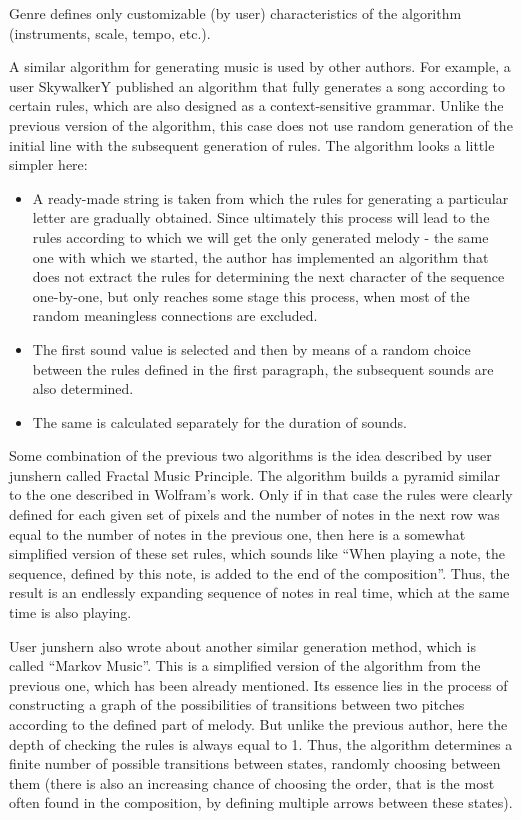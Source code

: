 \documentclass[thesis=B,english]{FITthesis}[2019/12/23]
\begin{document}
Genre defines only customizable (by user) characteristics of the algorithm (instruments, scale, tempo, etc.).

A similar algorithm for generating music is used by other authors. For example, a user SkywalkerY \cite{habr_SkywalkerY} published an algorithm that fully generates a song according to certain rules, which are also designed as a context-sensitive grammar. Unlike the previous version of the algorithm, this case does not use random generation of the initial line with the subsequent generation of rules. The algorithm looks a little simpler here:
\begin{itemize}
    \item A ready-made string is taken from which the rules for generating a particular letter are gradually obtained. Since ultimately this process will lead to the rules according to which we will get the only generated melody - the same one with which we started, the author has implemented an algorithm that does not extract the rules for determining the next character of the sequence one-by-one, but only reaches some stage this process, when most of the random meaningless connections are excluded.
    \item The first sound value is selected and then by means of a random choice between the rules defined in the first paragraph, the subsequent sounds are also determined.
    \item The same is calculated separately for the duration of sounds.
\end{itemize}

Some combination of the previous two algorithms is the idea described by user junshern \cite{junshern_github} called Fractal Music Principle. The algorithm builds a pyramid similar to the one described in Wolfram's work. Only if in that case the rules were clearly defined for each given set of pixels and the number of notes in the next row was equal to the number of notes in the previous one, then here is a somewhat simplified version of these set rules, which sounds like “When playing a note, the sequence, defined by this note, is added to the end of the composition”. Thus, the result is an endlessly expanding sequence of notes in real time, which at the same time is also playing.

User junshern \cite{junshern_github} also wrote about another similar generation method, which is called “Markov Music”. This is a simplified version of the algorithm from the previous one, which has been already mentioned. Its essence lies in the process of constructing a graph of the possibilities of transitions between two pitches according to the defined part of melody. But unlike the previous author, here the depth of checking the rules is always equal to 1. Thus, the algorithm determines a finite number of possible transitions between states, randomly choosing between them (there is also an increasing chance of choosing the order, that is the most often found in the composition, by defining multiple arrows between these states).
\end{document}
